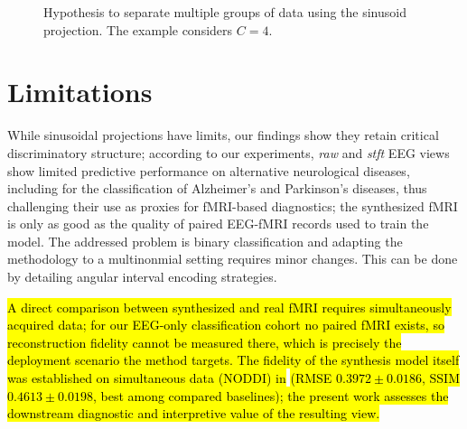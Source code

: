 \documentclass{article}
\begin{document}
\begin{figure}[ht]
    \centering
    \caption{Hypothesis to separate multiple groups of data using the sinusoid projection. The example considers $C=4$.}
    \label{future_work:fig:multi_label_sinusoid}
\end{figure}


\section*{Limitations} While sinusoidal projections have limits, our findings show they retain critical discriminatory structure; according to our experiments, \textit{raw} and \textit{stft} EEG views show limited predictive performance on alternative neurological diseases, including for the classification of Alzheimer's and Parkinson's diseases, thus challenging their use as proxies for fMRI-based diagnostics; the synthesized fMRI is only as good as the quality of paired EEG-fMRI records used to train the model. The addressed problem is binary classification and adapting the methodology to a multinonmial setting requires minor changes. This can be done by detailing angular interval encoding strategies.

\hl{A direct comparison between synthesized and real fMRI requires simultaneously acquired data; for our EEG-only classification cohort no paired fMRI exists, so reconstruction fidelity cannot be measured there, which is precisely the deployment scenario the method targets. The fidelity of the synthesis model itself was established on simultaneous data (NODDI) in }\cite{calhas2022eeg}\hl{ (RMSE $0.3972 \pm 0.0186$, SSIM $0.4613 \pm 0.0198$, best among compared baselines); the present work assesses the downstream diagnostic and interpretive value of the resulting view.}
\end{document}
